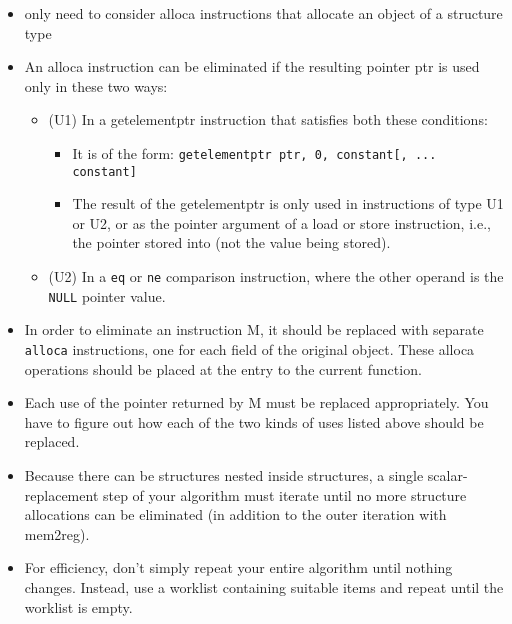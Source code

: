 \begin{itemize}
\item only need to consider alloca instructions that allocate an object of a structure type
\item An alloca instruction can be eliminated if the resulting pointer ptr is used only in these two ways:
\begin{itemize}
    \item (U1) In a getelementptr instruction that satisfies both these conditions:
    \begin{itemize}
        \item It is of the form: \lstinline|getelementptr ptr, 0, constant[, ... constant]|
        \item The result of the getelementptr is only used in instructions of type U1 or U2, or as the pointer
        argument of a load or store instruction, i.e., the pointer stored into (not the value being stored).

    \end{itemize}  
    \item (U2) In a \lstinline|eq| or \lstinline|ne| comparison instruction, where the other operand is the \lstinline|NULL| pointer value.
\end{itemize}    

\item In order to eliminate an instruction M, it should be replaced with separate \lstinline|alloca| instructions, one for each
field of the original object. These alloca operations should be placed at the entry to the current function.

\item Each use of the pointer returned by M must be replaced appropriately. You have to figure out how each of
the two kinds of uses listed above should be replaced.

\item Because there can be structures nested inside structures, a single scalar-replacement step of your algorithm
must iterate until no more structure allocations can be eliminated (in addition to the outer iteration with
mem2reg).

\item For efficiency, don’t simply repeat your entire algorithm until nothing changes. Instead, use a
worklist containing suitable items and repeat until the worklist is empty.


\end{itemize}    




























